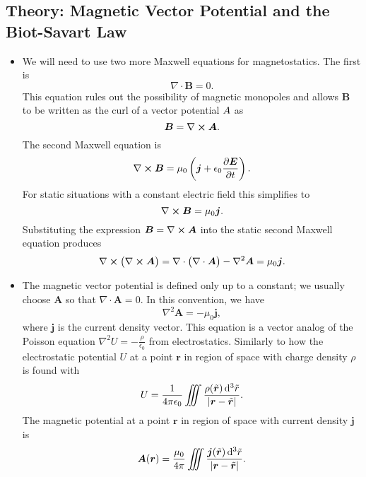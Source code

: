 \documentclass[11pt, a4paper]{article}
\newcommand{\diff}{\mathop{}\!\mathrm{d}} %
\renewcommand{\vec}[1]{\bm{#1}} %
\newcommand{\tvec}[1]{\tilde{\vec{#1}}} %
\renewcommand{\r}{\vec{r}}
\newcommand{\E}{\vec{E}}  %
\newcommand{\B}{\vec{B}}  %
\newcommand{\A}{\vec{A}}  %
\newcommand{\ee}{\epsilon_{0}}  %
\renewcommand{\div}{\nabla \cdot}
\renewcommand{\curl}{\nabla \cross}
\renewcommand{\laplacian}{\nabla^{2}}
\begin{document}
\subsection{Theory: Magnetic Vector Potential and the Biot-Savart Law}
\begin{itemize}
	\item We will need to use two more Maxwell equations for magnetostatics. The first is
	\begin{equation*}
		\div \B = 0.
	\end{equation*}
	This equation rules out the possibility of magnetic monopoles and allows $ \B $ to be written as the curl of a vector potential $ \\A $ as
	\begin{equation*}
		\B = \curl \A.
	\end{equation*}
	The second Maxwell equation is 
	\begin{equation*}
		\curl \B = \mu_{0}\left(\vec{j} + \ee \pdv{\E}{t}\right).
	\end{equation*}
	For static situations with a constant electric field this simplifies to
	\begin{equation*}
		\curl \B = \mu_{0}\vec{j}.
	\end{equation*}
	Substituting the expression $ \B = \curl \A $ into the static second Maxwell equation produces
	\begin{equation*}
		\curl \big(\curl \A\big) = \div \big(\div \A\big) - \laplacian \A = \mu_{0} \vec{j}.
	\end{equation*}
	
	\item The magnetic vector potential is defined only up to a constant; we usually choose $ \A $ so that $ \div \A = 0 $. In this convention, we have
	\begin{equation*}
		\laplacian \A = - \mu_{0}\vec{j},
	\end{equation*}
	where $ \vec{j} $ is the current density vector. This equation is a vector analog of the Poisson equation $ \laplacian U = - \frac{\rho}{\ee} $ from electrostatics. Similarly to how the electrostatic potential $ U $ at a point $ \r $ in region of space with charge density $ \rho $ is found with
	\begin{equation*}
		U = \frac{1}{4 \pi \ee} \iiint \frac{\rho(\tvec{r})\diff^{3}\tilde{r}}{\abs{\r - \tvec{r}}}.
	\end{equation*}
	The magnetic potential at a point $ \r $ in region of space with current density $ \vec{j} $ is
	\begin{equation*}
		\A(\r) = \frac{\mu_{0}}{4 \pi} \iiint \frac{\vec{j}(\tvec{r})\diff^{3}\tilde{r}}{\abs{\r - \tvec{r}}}.
	\end{equation*}
	

\end{itemize}
\end{document}
